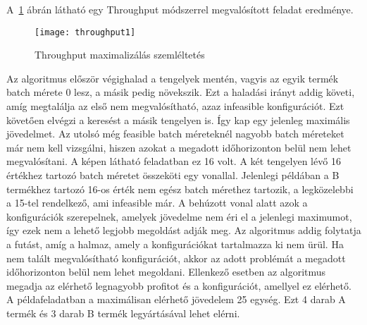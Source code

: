A~\ref{throughput1} ábrán látható egy Throughput módszerrel megvalósított feladat eredménye.
\begin{figure}[H]
\begin{center}
\texttt{[image: throughput1]}
\caption{Throughput maximalizálás szemléltetés}
\label{throughput1}
\end{center}
\end{figure}
Az algoritmus először végighalad a tengelyek mentén, vagyis az egyik termék batch mérete 0 lesz, a másik pedig növekszik. Ezt a haladási irányt addig követi, amíg megtalálja az első nem megvalósítható, azaz infeasible konfigurációt. Ezt követően elvégzi a keresést a másik tengelyen is. Így kap egy jelenleg maximális jövedelmet. Az utolsó még feasible batch méreteknél nagyobb batch méreteket már nem kell vizsgálni, hiszen azokat a megadott időhorizonton belül nem lehet megvalósítani. A képen látható feladatban ez 16 volt. A két tengelyen lévő 16 értékhez tartozó batch méretet összeköti egy vonallal. Jelenlegi példában a B termékhez tartozó 16-os érték nem egész batch mérethez tartozik, a legközelebbi a 15-tel rendelkező, ami infeasible már. A behúzott vonal alatt azok a konfigurációk szerepelnek, amelyek jövedelme nem éri el a jelenlegi maximumot, így ezek nem a lehető legjobb megoldást adják meg. Az algoritmus addig folytatja a futást, amíg a halmaz, amely a konfigurációkat tartalmazza ki nem ürül. Ha nem talált megvalósítható konfigurációt, akkor az adott problémát a megadott időhorizonton belül nem lehet megoldani. Ellenkező esetben az algoritmus megadja az elérhető legnagyobb profitot és a konfigurációt, amellyel ez elérhető. A példafeladatban a maximálisan elérhető jövedelem 25 egység. Ezt 4 darab A termék és 3 darab B termék legyártásával lehet elérni.
